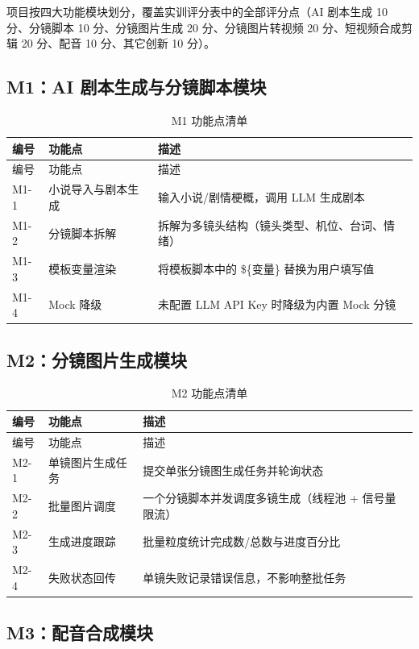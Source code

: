 \documentclass[12pt]{ctexrep}
\begin{document}
项目按四大功能模块划分，覆盖实训评分表中的全部评分点（AI 剧本生成 10 分、分镜脚本 10 分、分镜图片生成 20 分、分镜图片转视频 20 分、短视频合成剪辑 20 分、配音 10 分、其它创新 10 分）。

\subsection{M1：AI 剧本生成与分镜脚本模块}

\begin{longtable}{p{1.6cm}p{4cm}p{9.4cm}}
\caption{M1 功能点清单}\label{tab:m1}\\
\toprule
编号 & 功能点 & 描述\\
\midrule
\endfirsthead
\toprule
编号 & 功能点 & 描述\\
\midrule
\endhead
M1-1 & 小说导入与剧本生成 & 输入小说/剧情梗概，调用 LLM 生成剧本\\
M1-2 & 分镜脚本拆解 & 拆解为多镜头结构（镜头类型、机位、台词、情绪）\\
M1-3 & 模板变量渲染 & 将模板脚本中的 \$\{变量\} 替换为用户填写值\\
M1-4 & Mock 降级 & 未配置 LLM API Key 时降级为内置 Mock 分镜\\
\bottomrule
\end{longtable}

\subsection{M2：分镜图片生成模块}

\begin{longtable}{p{1.6cm}p{4cm}p{9.4cm}}
\caption{M2 功能点清单}\label{tab:m2}\\
\toprule
编号 & 功能点 & 描述\\
\midrule
\endfirsthead
\toprule
编号 & 功能点 & 描述\\
\midrule
\endhead
M2-1 & 单镜图片生成任务 & 提交单张分镜图生成任务并轮询状态\\
M2-2 & 批量图片调度 & 一个分镜脚本并发调度多镜生成（线程池 + 信号量限流）\\
M2-3 & 生成进度跟踪 & 批量粒度统计完成数/总数与进度百分比\\
M2-4 & 失败状态回传 & 单镜失败记录错误信息，不影响整批任务\\
\bottomrule
\end{longtable}

\subsection{M3：配音合成模块}
\end{document}
